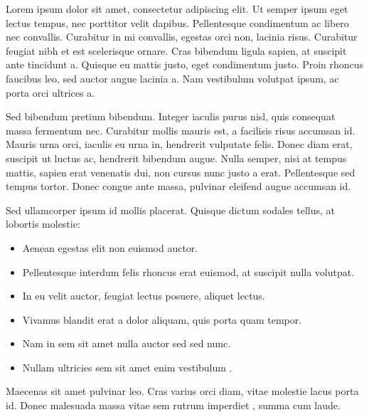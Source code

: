 \documentclass[11pt,a4paper]{fireview} %
\begin{document}
\begin{thesisreview}



Lorem ipsum dolor sit amet, consectetur adipiscing elit. Ut semper ipsum eget lectus tempus, nec porttitor velit dapibus. Pellentesque condimentum ac libero nec convallis. Curabitur in mi convallis, egestas orci non, lacinia risus. Curabitur feugiat nibh et est scelerisque ornare. Cras bibendum ligula sapien, at suscipit ante tincidunt a. Quisque eu mattis justo, eget condimentum justo. Proin rhoncus faucibus leo, sed auctor augue lacinia a. Nam vestibulum volutpat ipsum, ac porta orci ultrices a. 

Sed bibendum pretium bibendum. Integer iaculis purus nisl, quis consequat massa fermentum nec. Curabitur mollis mauris est, a facilisis risus accumsan id. Mauris urna orci, iaculis eu urna in, hendrerit vulputate felis. Donec diam erat, suscipit ut luctus ac, hendrerit bibendum augue. Nulla semper, nisi at tempus mattis, sapien erat venenatis dui, non cursus nunc justo a erat. Pellentesque sed tempus tortor. Donec congue ante massa, pulvinar eleifend augue accumsan id.

Sed ullamcorper ipsum id mollis placerat. Quisque dictum sodales tellus, at lobortis molestie:
\vspace{-5pt}
\begin{itemize}
 \item Aenean egestas elit non euismod auctor.
 \item Pellentesque interdum felis rhoncus erat euismod, at suscipit nulla volutpat.
 \item In eu velit auctor, feugiat lectus posuere, aliquet lectus.
 \item Vivamus blandit erat a dolor aliquam, quis porta quam tempor.
 \item Nam in sem sit amet nulla auctor  sed sed nunc.
 \item Nullam ultricies sem sit amet enim vestibulum .
\end{itemize}

\begin{thesisrating}
Maecenas sit amet pulvinar leo. Cras varius orci diam, vitae molestie lacus porta id. Donec malesuada massa vitae sem rutrum imperdiet , summa cum laude.
\end{thesisrating}


\end{thesisreview}
\end{document}
